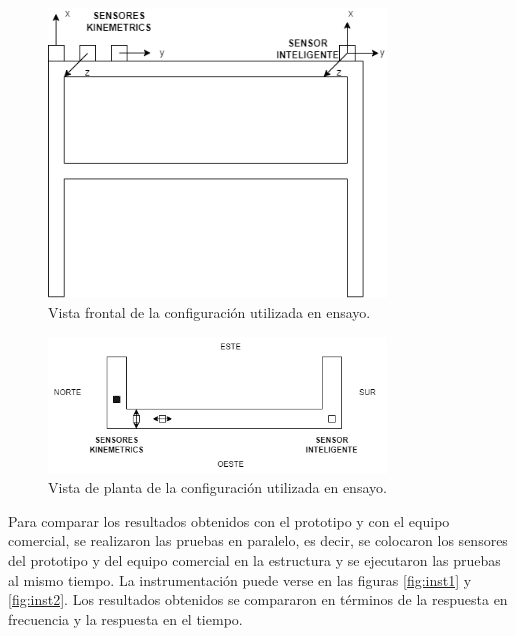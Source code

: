 \begin{figure}[H]
    \centering
    \includegraphics[width = 0.8\textwidth]{imagenes/cap3_resultados/Ensayos/CONFIGURACION1.png}
    \caption{Vista frontal de la configuración utilizada en ensayo.}
    \label{fig:configuracionensayofrontal}
\end{figure}

\begin{figure}[H]
    \centering
    \includegraphics[width = 0.8\textwidth]{imagenes/cap3_resultados/Ensayos/CONFIGURACION1PLANTA.png}
    \caption{Vista de planta de la configuración utilizada en ensayo.}
    \label{fig:configuracionensayoplanta}
\end{figure}


Para comparar los resultados obtenidos con el prototipo y con el equipo comercial, se realizaron las pruebas en paralelo, es decir, se colocaron los sensores del prototipo y del equipo comercial en la estructura y se ejecutaron las pruebas al mismo tiempo. La instrumentación puede verse en las figuras \ref{fig:inst1} y \ref{fig:inst2}. Los resultados obtenidos se compararon en términos de la respuesta en frecuencia y la respuesta en el tiempo.


